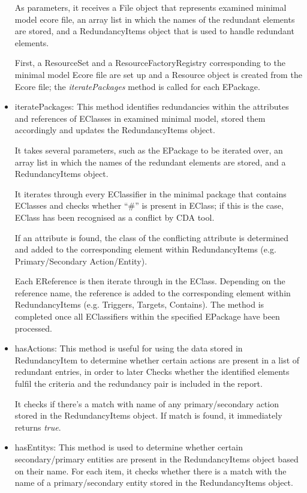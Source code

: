 \begin{itemize}
	As parameters, it receives a File object that represents examined minimal model ecore file, an array list in which the names of the redundant elements are stored, and a RedundancyItems object that is used to handle redundant elements. 
	
	First, a ResourceSet and a ResourceFactoryRegistry corresponding to the minimal model Ecore file are set up and a Resource object is created from the Ecore file; the \textit{iteratePackages} method is called for each EPackage.
	
	\item iteratePackages: This method identifies redundancies within the attributes and references of EClasses in examined minimal model, stored them accordingly and updates the RedundancyItems object.
	
	It takes several parameters, such as the EPackage to be iterated over, an array list in which the names of the redundant elements are stored, and a RedundancyItems object. 
	
	It iterates through every EClassifier in the minimal package that contains EClasses and checks whether \enquote{\#} is present in EClass; if this is the case, EClass has been recognised as a conflict by CDA tool.
	
	If an attribute is found, the class of the conflicting attribute is determined and added to the corresponding element within RedundancyItems (e.g. Primary/Secondary Action/Entity). 
	
	Each EReference is then iterate through in the EClass. Depending on the reference name, the reference is added to the corresponding element within RedundancyItems (e.g. Triggers, Targets, Contains). The method is completed once all EClassifiers within the specified EPackage have been processed.
	
	\item hasActions: This method is useful for using the data stored in RedundancyItem to determine whether certain actions are present in a list of redundant entries, in order to later Checks whether the identified elements fulfil the criteria and the redundancy pair is included in the report.
	
	It checks if there's a match with name of any primary/secondary action stored in the RedundancyItems object. If match is found, it immediately returns \textit{true}.
	
	\item hasEntitys: This method is used to determine whether certain secondary/primary entities  are present in the RedundancyItems object based on their name. For each item, it checks whether there is a match with the name of a primary/secondary entity stored in the RedundancyItems object. 
	

\end{itemize}

